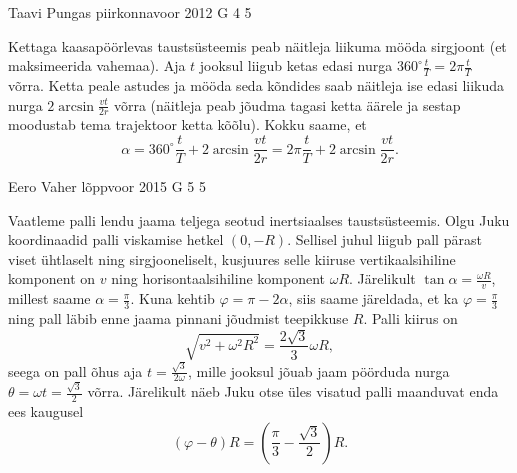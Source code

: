 \documentclass[11pt]{article}
\begin{document}
{%
{Taavi Pungas} %
{piirkonnavoor} %
{2012} %
{G 4} %
{5} %
{

\ifSolution
Kettaga kaasapöörlevas taustsüsteemis peab näitleja liikuma mööda sirgjoont (et maksimeerida vahemaa).
Aja $t$ jooksul liigub ketas edasi nurga $360^\circ\frac{t}{T}=2\pi\frac{t}{T}$ võrra. Ketta peale astudes ja mööda seda kõndides saab näitleja ise edasi liikuda nurga $2\arcsin\frac{vt}{2r}$ võrra (näitleja peab jõudma tagasi ketta äärele ja sestap moodustab tema trajektoor ketta kõõlu). Kokku saame, et 
$$\alpha=360^\circ\frac{t}{T}+2\arcsin\frac{vt}{2r}=2\pi\frac{t}{T}+2\arcsin\frac{vt}{2r}.$$
\fi
}

{Eero Vaher} %
{lõppvoor} %
{2015} %
{G 5} %
{5} %
{

\ifSolution
Vaatleme palli lendu jaama teljega seotud inertsiaalses taustsüsteemis. Olgu Juku koordinaadid palli viskamise hetkel $(0,-R)$. Sellisel juhul liigub pall pärast viset ühtlaselt ning sirgjooneliselt, kusjuures selle kiiruse vertikaalsihiline komponent on $v$ ning horisontaalsihiline komponent $\omega R$. Järelikult $\tan\alpha=\frac{\omega R}{v}$, millest saame $\alpha=\frac{\pi}{3}$. Kuna kehtib $\varphi=\pi-2\alpha$, siis saame järeldada, et ka $\varphi=\frac{\pi}{3}$ ning pall läbib enne jaama pinnani jõudmist teepikkuse $R$. Palli kiirus on
\[
\sqrt{v^2+\omega^2R^2}=\frac{2\sqrt{3}}{3}\omega R,
\]
seega on pall õhus aja $t=\frac{\sqrt{3}}{2\omega}$, mille jooksul jõuab jaam pöörduda nurga $\theta=\omega t=\frac{\sqrt{3}}{2}$ võrra. Järelikult näeb Juku otse üles visatud palli maanduvat enda ees kaugusel
\[
\left(\varphi-\theta\right)R=\left(\frac{\pi}{3}-\frac{\sqrt{3}}{2}\right)R.
\]

\begin{center}
\end{center}
\fi
}

}
\end{document}
